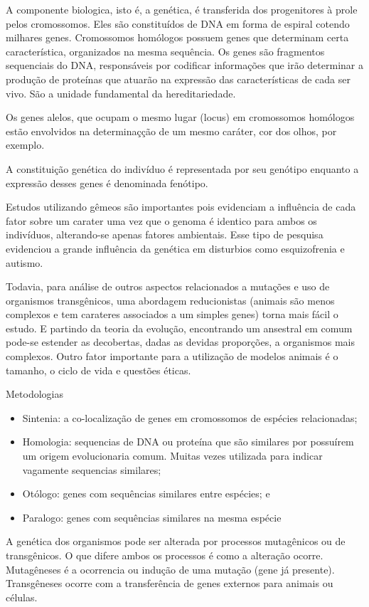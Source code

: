 \documentclass[
	article,			%
	12pt,				%
	oneside,			%
	a4paper,			%
	english,			%
	brazil,				%
	sumario=tradicional
	]{abntex2}
\begin{document}
A componente biologica, isto é, a genética, é transferida dos progenitores à prole pelos cromossomos.
Eles são constituídos de DNA em forma de espiral cotendo milhares genes.
Cromossomos homólogos possuem genes que determinam certa característica, organizados na mesma sequência. Os genes são  fragmentos sequenciais do DNA, responsáveis por codificar informações que irão determinar a produção de proteínas que atuarão na expressão das características de cada ser vivo. São a unidade fundamental da hereditariedade.

Os genes alelos, que ocupam o mesmo lugar (locus) em cromossomos homólogos estão envolvidos na determinaçção de um mesmo caráter, cor dos olhos, por exemplo.

A constituição genética do indivíduo é representada por seu genótipo enquanto a expressão desses genes é denominada fenótipo.




Estudos utilizando gêmeos são importantes pois evidenciam a influência de cada fator sobre um carater uma vez que o genoma é identico para ambos os indivíduos, alterando-se apenas fatores ambientais. Esse tipo de pesquisa evidenciou a grande influência da genética em disturbios como esquizofrenia e autismo.

Todavia, para análise de outros aspectos relacionados a mutações e uso de organismos transgênicos, uma abordagem reducionistas (animais são menos complexos e tem carateres associados a um simples genes) torna mais fácil o estudo. E partindo da teoria da evolução, encontrando um ansestral em comum pode-se estender as decobertas, dadas as devidas proporções, a organismos mais complexos. Outro fator importante para a utilização de modelos animais é o tamanho, o ciclo de vida e questões éticas.

Metodologias
\begin{itemize}
    \item Sintenia:	a	co-localização	de	genes	em cromossomos	de	espécies relacionadas;
    \item Homologia:	sequencias	de	DNA	ou proteína	que	são similares	por	 possuírem	um	origem	evolucionaria	 comum. Muitas	vezes	utilizada para	indicar	vagamente sequencias similares;
    \item Otólogo:	genes	com	sequências	 similares	entre espécies; e
    \item Paralogo: genes	com	sequências	 similares	na	mesma espécie
\end{itemize}
	

A genética dos organismos pode ser alterada por processos mutagênicos ou de transgênicos. O que difere ambos os processos é como a alteração ocorre. Mutagêneses é a ocorrencia ou indução de uma mutação (gene já presente). Transgêneses ocorre com a transferência de genes externos para animais ou células.
\end{document}
